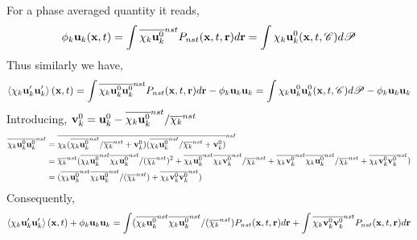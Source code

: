 \documentclass[12pt]{My_preprint}
\begin{document}
For a phase averaged quantity it reads, 
\begin{equation*}
    \phi_k \textbf{u}_k(\textbf{x},t)
    = \int \overline{\chi_k \textbf{u}_k^0}^{nst}  P_{nst}(\textbf{x},t,\textbf{r}) d\textbf{r}
    = \int  \chi_k \textbf{u}^0_k(\textbf{x},t,\mathscr{C}) d\mathscr{P} 
\end{equation*}
Thus similarly we have, 
\begin{equation*}
    \left<\chi_k \textbf{u}'_k\textbf{u}'_k\right>(\textbf{x},t)
    = \int \overline{\chi_k \textbf{u}_k^0\textbf{u}_k^0}^{nst}  P_{nst}(\textbf{x},t,\textbf{r}) d\textbf{r}
    - \phi_k \textbf{u}_k\textbf{u}_k
    = \int  \chi_k \textbf{u}^0_k\textbf{u}^0_k(\textbf{x},t,\mathscr{C}) d\mathscr{P} 
    - \phi_k \textbf{u}_k\textbf{u}_k
\end{equation*}
Introducing, $\textbf{v}_k^0  = \textbf{u}_k^0 - \overline{\chi_k \textbf{u}^0_k}^{nst} / \overline{\chi_k}^{nst}$
\begin{align*}
    \overline{\chi_k \textbf{u}_k^0\textbf{u}_k^0}^{nst} 
    &= 
    \overline{\chi_k (\overline{\chi_k \textbf{u}^0_k}^{nst} / \overline{\chi_k}^{nst} + \textbf{v}_k^0)(\overline{\chi_k \textbf{u}^0_k}^{nst} / \overline{\chi_k}^{nst} + \textbf{v}_k^0)}^{nst} \\
    &= 
    \overline{\chi_k}^{nst} (\overline{\chi_k \textbf{u}^0_k}^{nst}  \overline{\chi_k \textbf{u}^0_k}^{nst} / (\overline{\chi_k}^{nst})^2 
    + \overline{\chi_k \textbf{u}^0_k}^{nst} \overline{\chi_k\textbf{v}_k^0}^{nst}/ \overline{\chi_k}^{nst}
    + \overline{\chi_k\textbf{v}_k^0}^{nst} \overline{\chi_k \textbf{u}^0_k}^{nst} / \overline{\chi_k}^{nst}
    + \overline{\chi_k \textbf{v}_k^0\textbf{v}_k^0}^{nst}
    )\\
    &= 
     (\overline{\chi_k \textbf{u}^0_k}^{nst}  \overline{\chi_k \textbf{u}^0_k}^{nst} / (\overline{\chi_k}^{nst})
    + \overline{\chi_k \textbf{v}_k^0\textbf{v}_k^0}^{nst}
    )\\
\end{align*}
Consequently, 
\begin{equation*}
    \left<\chi_k \textbf{u}'_k\textbf{u}'_k\right>(\textbf{x},t)
    + \phi_k \textbf{u}_k\textbf{u}_k
    = 
    \int (\overline{\chi_k \textbf{u}^0_k}^{nst}  \overline{\chi_k \textbf{u}^0_k}^{nst} / (\overline{\chi_k}^{nst})  P_{nst}(\textbf{x},t,\textbf{r}) d\textbf{r}
    +\int \overline{\chi_k \textbf{v}_k^0\textbf{v}_k^0}^{nst}  P_{nst}(\textbf{x},t,\textbf{r}) d\textbf{r}
\end{equation*}
\end{document}
